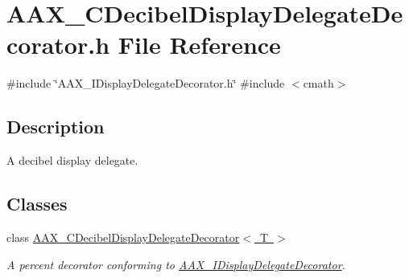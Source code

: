 \hypertarget{a00419}{}\section{A\+A\+X\+\_\+\+C\+Decibel\+Display\+Delegate\+Decorator.\+h File Reference}
\label{a00419}
{\ttfamily \#include \char`\"{}A\+A\+X\+\_\+\+I\+Display\+Delegate\+Decorator.\+h\char`\"{}}\newline
{\ttfamily \#include $<$cmath$>$}\newline


\subsection{Description}
A decibel display delegate. 

\subsection*{Classes}
\begin{DoxyCompactItemize}
\item 
class \mbox{\hyperlink{a01469}{A\+A\+X\+\_\+\+C\+Decibel\+Display\+Delegate\+Decorator$<$ T $>$}}
\begin{DoxyCompactList}\small\item\em A percent decorator conforming to \mbox{\hyperlink{a01805}{A\+A\+X\+\_\+\+I\+Display\+Delegate\+Decorator}}. \end{DoxyCompactList}\end{DoxyCompactItemize}
